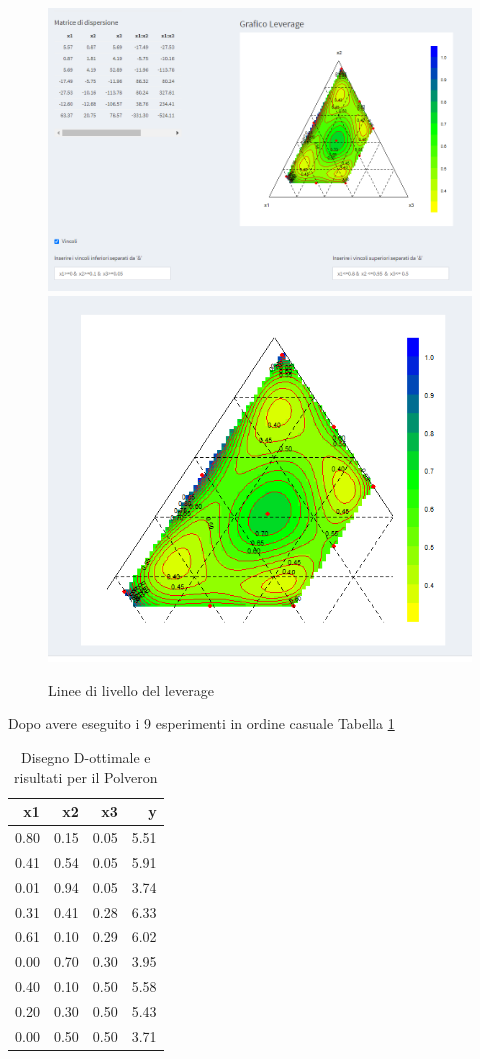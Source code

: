 \documentclass[
  11pt,
]{book}
\begin{document}
\begin{figure}[ht]
\includegraphics[width=0.5\linewidth]{Immagini/Mixt/22_lev} \includegraphics[width=0.5\linewidth]{Immagini/Mixt/23_lev} \caption{Linee di livello del leverage}\label{fig:mixfig22}
\end{figure}

Dopo avere eseguito i 9 esperimenti in ordine casuale Tabella \ref{tab:mixDOpt}

\begin{table}

\caption{\label{tab:mixDOpt}Disegno D-ottimale e risultati per il Polveron }
\centering
\begin{tabular}[t]{r|r|r|r}
\hline
x1 & x2 & x3 & y\\
\hline
0.80 & 0.15 & 0.05 & 5.51\\
\hline
0.41 & 0.54 & 0.05 & 5.91\\
\hline
0.01 & 0.94 & 0.05 & 3.74\\
\hline
0.31 & 0.41 & 0.28 & 6.33\\
\hline
0.61 & 0.10 & 0.29 & 6.02\\
\hline
0.00 & 0.70 & 0.30 & 3.95\\
\hline
0.40 & 0.10 & 0.50 & 5.58\\
\hline
0.20 & 0.30 & 0.50 & 5.43\\
\hline
0.00 & 0.50 & 0.50 & 3.71\\
\hline
\end{tabular}
\end{table}
\end{document}
